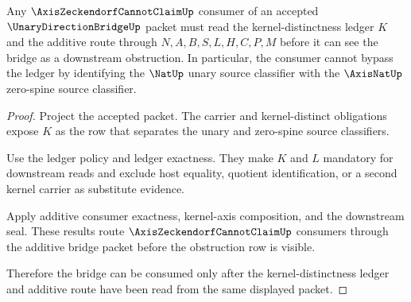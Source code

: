 \begin{theorem}
\label{thm:unary-direction-bridge-axiszeckendorf-ledger-gate}
Any $\AxisZeckendorfCannotClaimUp$ consumer of an accepted $\UnaryDirectionBridgeUp$ packet must read the kernel-distinctness ledger $K$ and the additive route through $N,A,B,S,L,H,C,P,M$ before it can see the bridge as a downstream obstruction. In particular, the consumer cannot bypass the ledger by identifying the $\NatUp$ unary source classifier with the $\AxisNatUp$ zero-spine source classifier.
\end{theorem}
\begin{proof}
Project the accepted packet. The carrier and kernel-distinct obligations expose $K$ as the row that separates the unary and zero-spine source classifiers.

Use the ledger policy and ledger exactness. They make $K$ and $L$ mandatory for downstream reads and exclude host equality, quotient identification, or a second kernel carrier as substitute evidence.

Apply additive consumer exactness, kernel-axis composition, and the downstream seal. These results route $\AxisZeckendorfCannotClaimUp$ consumers through the additive bridge packet before the obstruction row is visible.

Therefore the bridge can be consumed only after the kernel-distinctness ledger and additive route have been read from the same displayed packet.
\end{proof}

